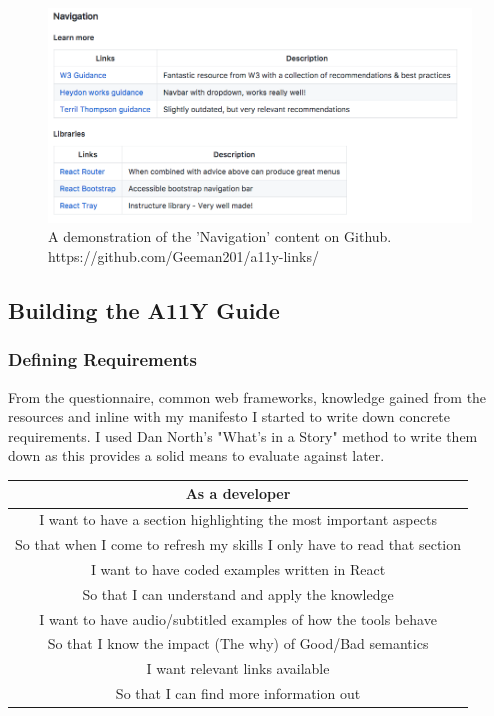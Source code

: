 \begin{figure}[H]
\centering
\includegraphics[width=\textwidth]{figures/documentation_link_example}
\captionsetup{justification=centering}
\caption{A demonstration of the 'Navigation' content on Github.
https://github.com/Geeman201/a11y-links/
\label{fig:allyLinksDemo}}
\end{figure}


\subsection{Building the A11Y Guide}
\subsubsection{Defining Requirements}
From the questionnaire, common web frameworks, knowledge gained from the
resources and inline with my manifesto I started to write down concrete
requirements. I used Dan North's "What's in a Story" method to write them
down as this provides a solid means to evaluate against later.

\begin{center}
 \begin{tabular}{| c |}
 \hline
 As a developer \\
 \hline
 I want to have a section highlighting the most important aspects \\
 So that when I come to refresh my skills I only have to read that section  \\
 \hline
 I want to have coded examples written in React \\
 So that I can understand and apply the knowledge \\
 \hline
 I want to have audio/subtitled examples of how the tools behave  \\
 So that I know the impact (The why) of Good/Bad semantics  \\
 \hline
 I want relevant links available  \\
 So that I can find more information out  \\
 \hline
\end{tabular}
\end{center}

